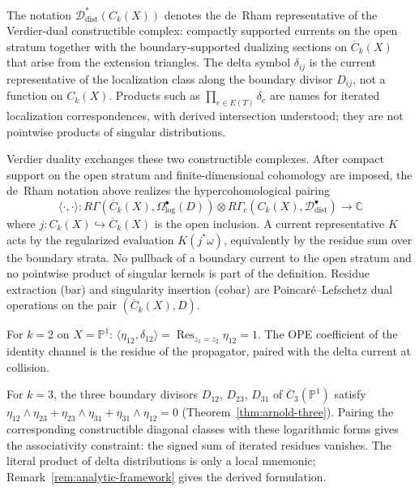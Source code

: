 The notation $\mathcal{D}^*_{\mathrm{dist}}(C_k(X))$ denotes the
de~Rham representative of the Verdier-dual constructible complex:
compactly supported currents on the open stratum together with the
boundary-supported dualizing sections on $\overline{C}_k(X)$ that
arise from the extension triangles. The delta symbol
$\delta_{ij}$ is the current representative of the localization class
along the boundary divisor $D_{ij}$, not a function on $C_k(X)$.
Products such as $\prod_{e\in E(T)}\delta_e$ are names for iterated
localization correspondences, with derived intersection understood;
they are not pointwise products of singular distributions.

Verdier duality exchanges these two constructible complexes. After
compact support on the open stratum and finite-dimensional
cohomology are imposed, the de~Rham notation above realizes the
hypercohomological pairing
\begin{equation}\label{eq:log-dist-pairing-pd}
\langle \cdot, \cdot \rangle \colon
R\Gamma(\overline{C}_k(X),\Omega^\bullet_{\log}(D))
\otimes
R\Gamma_c(C_k(X),\mathcal{D}^\bullet_{\mathrm{dist}})
\longrightarrow \mathbb{C}
\end{equation}
where $j\colon C_k(X)\hookrightarrow\overline{C}_k(X)$ is the open
inclusion. A current representative $K$ acts by the regularized
evaluation $K(j^*\omega)$, equivalently by the residue sum over the
boundary strata. No pullback of a boundary current to the open
stratum and no pointwise product of singular kernels is part of the
definition. Residue extraction (bar) and singularity insertion
(cobar) are Poincar\'e--Lefschetz dual operations on the pair
$(\overline{C}_k(X),D)$.

\begin{example}
For $k = 2$ on $X = \mathbb{P}^1$:
$\langle \eta_{12}, \delta_{12} \rangle
= \operatorname{Res}_{z_1 = z_2} \eta_{12} = 1$.
The OPE coefficient of the identity channel is the residue of the
propagator, paired with the delta current at collision.
\end{example}

\begin{example}
For $k = 3$, the three boundary divisors $D_{12}$, $D_{23}$,
$D_{31}$ of $\overline{C}_3(\mathbb{P}^1)$ satisfy
$\eta_{12} \wedge \eta_{23} + \eta_{23} \wedge \eta_{31}
+ \eta_{31} \wedge \eta_{12} = 0$
(Theorem~\ref{thm:arnold-three}). Pairing the corresponding
constructible diagonal classes with these logarithmic forms gives
the associativity constraint: the signed sum of iterated residues
vanishes. The literal product of delta distributions is only a local
mnemonic; Remark~\ref{rem:analytic-framework} gives the derived
formulation.
\end{example}

